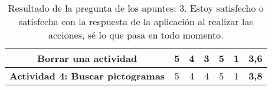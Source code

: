 \begin{table}[H]
{\begin{tabular}{c|cccccc|}
            \multicolumn{1}{|c|}{\textbf{Borrar una actividad}}            & \multicolumn{1}{c|}{5}                                                                                                                                                                                & \multicolumn{1}{c|}{4}                  & \multicolumn{1}{c|}{3}                  & \multicolumn{1}{c|}{5}                  & \multicolumn{1}{c|}{1}                  & \textbf{3,6}                        \\ \hline
            \multicolumn{1}{|c|}{\textbf{Actividad 4: Buscar pictogramas}} & \multicolumn{1}{c|}{5}                                                                                                                                                                                & \multicolumn{1}{c|}{4}                  & \multicolumn{1}{c|}{4}                  & \multicolumn{1}{c|}{5}                  & \multicolumn{1}{c|}{1}                  & \textbf{3,8}                        \\ \hline
        \end{tabular}%
    }
    \caption{Resultado de la pregunta de los apuntes: 3. Estoy satisfecho o satisfecha con la respuesta de la aplicación al realizar las acciones, sé lo que pasa en todo momento.}
    \label{tab:pregunta3Apunte}
\end{table}

